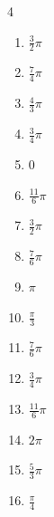 \begin{multicols}{4}
\begin{enumerate}
  \item $\displaystyle \frac{3}{2}\pi$

  \item $\displaystyle \frac{7}{4}\pi$

  \item $\displaystyle \frac{4}{3}\pi$

  \item $\displaystyle \frac{3}{4}\pi$

  \item $\displaystyle 0$

  \item $\displaystyle \frac{11}{6}\pi$

  \item $\displaystyle \frac{3}{2}\pi$

  \item $\displaystyle \frac{7}{6}\pi$

  \item $\displaystyle \pi$

  \item $\displaystyle \frac{\pi}{3}$

  \item $\displaystyle \frac{7}{6}\pi$

  \item $\displaystyle \frac{3}{4}\pi$

  \item $\displaystyle \frac{11}{6}\pi$

  \item $\displaystyle 2\pi$

  \item $\displaystyle \frac{5}{3}\pi$

  \item $\displaystyle \frac{\pi}{4}$


\end{enumerate}
\end{multicols}

